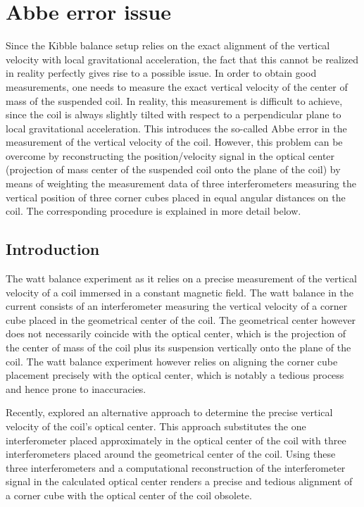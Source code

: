 \documentclass{report}
\numberwithin{tm}{section}
\begin{document}
\section{Abbe error issue}
Since the Kibble balance setup relies on the exact alignment of the vertical velocity with local gravitational acceleration, the fact that this cannot be realized in reality perfectly gives rise to a possible issue. In order to obtain good measurements, one needs to measure the exact vertical velocity of the center of mass of the suspended coil. In reality, this measurement is difficult to achieve, since the coil is always slightly tilted with respect to a perpendicular plane to local gravitational acceleration. This introduces the so-called Abbe error in the measurement of the vertical velocity of the coil. However, this problem can be overcome by reconstructing the position/velocity signal in the optical center (projection of mass center of the suspended coil onto the plane of the coil) by means of weighting the measurement data of three interferometers measuring the vertical position of three corner cubes placed in equal angular distances on the coil. The corresponding procedure is explained in more detail below.

\subsection{Introduction}
The watt balance experiment as it relies on a precise measurement of the vertical velocity of a coil immersed in a constant magnetic field. The watt balance in the current consists of an interferometer measuring the vertical velocity of a corner cube placed in the geometrical center of the coil. The geometrical center however does not necessarily coincide with the optical center, which is the projection of the center of mass of the coil plus its suspension vertically onto the plane of the coil. The watt balance experiment however relies on aligning the corner cube placement precisely with the optical center, which is notably a tedious process and hence prone to inaccuracies.

Recently, \cite{Glardon.2024} explored an alternative approach to determine the precise vertical velocity of the coil's optical center. This approach substitutes the one interferometer placed approximately in the optical center of the coil with three interferometers placed around the geometrical center of the coil. Using these three interferometers and a computational reconstruction of the interferometer signal in the calculated optical center renders a precise and tedious alignment of a corner cube with the optical center of the coil obsolete.
\end{document}
